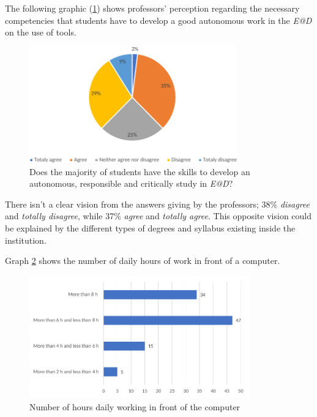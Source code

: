 \documentclass{textolivre}
\begin{document}
The following graphic (\ref{fig5}) shows professors' perception regarding the necessary competencies that students have to develop a good autonomous work in the \emph{E@D} on the use of tools.

\begin{figure}[h!]
 \centering
 \includegraphics[width=0.8\textwidth]{Fig_005.pdf}
 \caption{Does the majority of students have the skills to develop an autonomous, responsible and critically study in \emph{E@D}?}
 \label{fig5}
\end{figure}

There isn't a clear vision from the answers giving by the professors; 38\% \emph{disagree} and \emph{totally disagree}, while 37\% \emph{agree} and \emph{totally agree}. This opposite vision could be explained by the different types of degrees and syllabus existing inside the institution. 

Graph \ref{fig6} shows the number of daily hours of work in front of a computer.

\begin{figure}[h!]
 \centering
 \includegraphics[width=0.85\textwidth]{Fig_006.pdf}
 \caption{Number of hours daily working in front of the computer}
 \label{fig6}
\end{figure}
\end{document}
